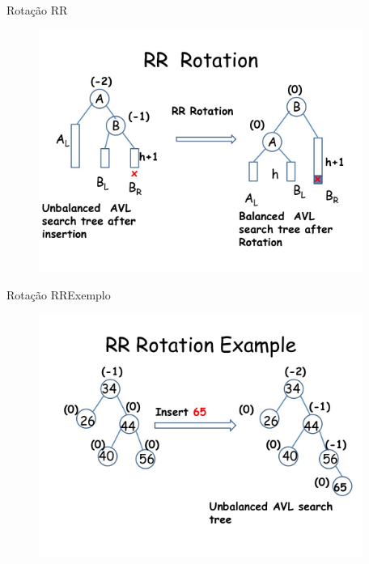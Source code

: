 \documentclass[aspectratio=169]{beamer}
\begin{document}
\begin{frame}{Rotação RR}
\begin{figure}[!h]
  \centering
  \includegraphics[width=300pt]{imagens/rr_rotation1.png}
  \label{fig_rr_rotation1}
\end{figure}
\end{frame}


\begin{frame}{Rotação RR}{Exemplo}
\begin{figure}[!h]
  \centering
  \includegraphics[width=300pt]{imagens/rr_rotation_example.png}
  \label{fig_rr_rotation_example}
\end{figure}
\end{frame}

\end{document}
